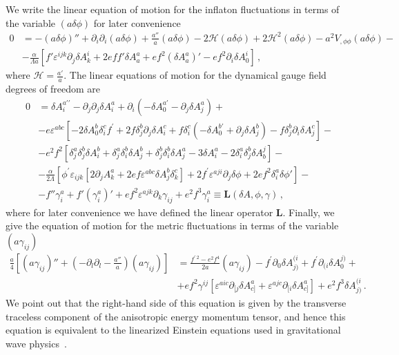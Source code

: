 We write the linear equation of motion for the inflaton fluctuations in terms of the variable $(a \delta \phi)$ for later convenience
\begin{align}
0 & = - \left(a \delta \phi\right)'' + \partial_i \partial_i \left(a \delta \phi\right) + \frac{a''}{a} \left(a \delta \phi\right) - 2 \mathcal{H} \left(a \delta \phi\right) + 2 \mathcal{H}^2 \left(a \delta \phi\right) - a^2 V_{,\phi\phi} \left(a \delta \phi\right) - \nonumber \\
& - \frac{\alpha}{\Lambda a} \left[f' \varepsilon^{ijk} \partial_j \delta A^i_k + 2 e f f' \delta A^a_a + e f^2 \left(\delta A^a_a\right)' - e f^2 \partial_i \delta A^i_0 \right] \,,
\label{eq:EOMInflatonFluc}
\end{align}
where $\mathcal{H} = \frac{a'}{a}$. The linear equations of motion for the dynamical gauge field degrees of freedom are
\begin{align}
0 &= \delta A_i^{a \prime \prime } - \partial_j \partial_j \delta A_i^{a}  + \partial_i \left( -\delta A_0^{a \prime} - \partial_j \delta A^{a}_j \right) + \nonumber \\
& - e \varepsilon^{a b c } \left[ -2 \delta A_0^{b} \delta^c_i f^\prime  + 2 f \delta^b_j \partial_j \delta A_i^{c} + f \delta^c_i  (- \delta A_0^{b \prime} + \partial_j \delta A^{b}_j) - f \delta^b_j \partial_i \delta A_j^{c} \right] - \nonumber \\
& - e^2 f^2 \left[ \delta^a_j \delta^b_j \delta A_i^{b}+ \delta^a_j\delta^b_i \delta A_j^{b}+ \delta^b_j\delta^b_i \delta A_j^{a} - 3 \delta A_i^{a} - 2 \delta^a_i\delta^b_j \delta A_b^{j} \right] - \nonumber \\
& - \frac{\alpha}{2 \Lambda}\left[ \phi^\prime \varepsilon_{ i j k} \left[2 \partial_j A^a_k + 2 e f \varepsilon^{abc} \delta A_j^{b} \delta^c_k\right] + 2 f^\prime \varepsilon^{aji}\partial_j \delta \phi + 2 e f^2 \delta^a_i \delta \phi' \right] - \nonumber \\
& - f'' \gamma^{a}_i + f' \left(\gamma^a_i\right)' + e f^2  \varepsilon^{ajk} \partial_k \gamma_{ij} + e^2 f^3 \gamma^a_{i}  \equiv {\mathbf L}(\delta A,\phi,\gamma)\,,
\label{eq:eom_i_linear}
\end{align}
where for later convenience we have defined the linear operator $\mathbf L$. Finally, we give the equation of motion for the metric fluctuations in terms of the variable $(a \gamma_{ij})$ 
\begin{align}
\frac{a}{4}\left[(a \gamma_{ij})'' + \left(-\partial_l\partial_l - \frac{a''}{a} \right) (a \gamma_{ij})\right] & = \frac{f^{\prime \ 2} - e^2 f^4}{2 a}(a \gamma_{ij} ) - f^\prime \partial_0 \delta A^{(i}_{j)}  + f^\prime \partial_{(i} \delta A^{j)}_0 + \nonumber \\
& + e f^2 \gamma^{ij} \left[\varepsilon^{aic} \partial_{[j} \delta A^a_{c]} + \varepsilon^{ajc} \partial_{[i} \delta A^a_{c]} \right] + e^2  f^3  \delta A^{(i}_{j)} \,.
\label{eq:eomGWs}
\end{align}
{We point out that the right-hand side of this equation is given by the transverse traceless component of the anisotropic energy momentum tensor, and hence this equation is equivalent to the linearized Einstein equations used in gravitational wave physics~\cite{Maggiore:1999vm}. }

